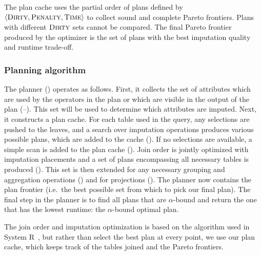 The plan cache uses the partial order of plans defined by  $\langle \textsc{Dirty}, \textsc{Penalty}, \textsc{Time} \rangle$ to
collect sound and complete Pareto frontiers. Plans with different $\textsc{Dirty}$ sets cannot be compared. The final
Pareto frontier produced by the optimizer is the set of plans with the best imputation
quality and runtime trade-off.

\subsubsection{Planning algorithm}
The planner () operates as follows.
First, it collects the set of attributes which are used by the operators in the plan or which are visible in the output of the plan (--).
This set will be used to determine which attributes are imputed.
Next, it constructs a plan cache. For each table used in the query, any selections are pushed to the leaves, and a search over imputation operations produces various possible plans, which are added to the cache ().
If no selections are available, a 
simple scan is added to the plan cache (). Join order is jointly optimized with imputation placements and a set of
plans encompassing all necessary tables is produced (). This set is then extended for any necessary grouping and aggregation
operations () and for projections (). The planner now contains the plan frontier (i.e.\ the
best possible set from which to pick our final plan). The final step in the planner is to find all plans that are
$\alpha$-bound and return the one that has the lowest runtime: the $\alpha$-bound optimal plan.

The join order and imputation optimization is based on the algorithm used in System R~\cite{blasgen1981system},
but rather than select the best plan at every point, we use our plan cache, which keeps track of the tables joined and the Pareto frontiers.

\begin{algorithm}

\end{algorithm}

%

